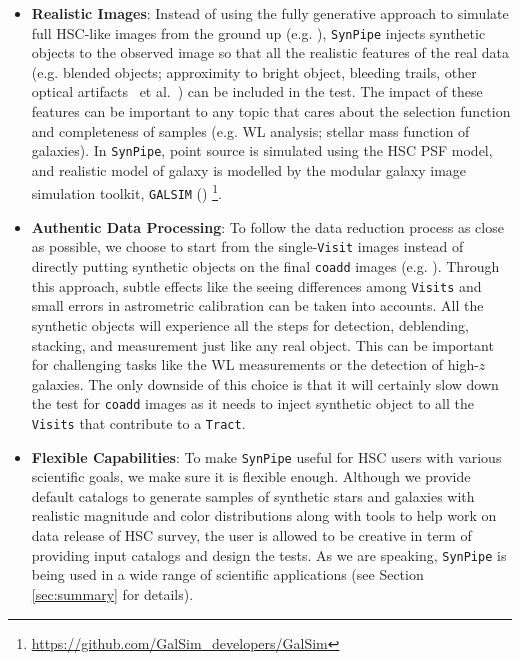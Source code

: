 \documentclass[useamsfonts]{pasj01}
\def\etal{{\ et al.~}}
\def\synpipe{\texttt{SynPipe}}
\def\tract{\texttt{Tract}}
\def\visit{\texttt{Visit}}
\def\visits{\texttt{Visits}}
\def\galsim{\texttt{G}{\scriptsize \texttt{AL}}\texttt{S}{\scriptsize \texttt{IM}}}
\begin{document}
    \begin{itemize}
    
        \item \textbf{Realistic Images}: 
            Instead of using the fully generative approach to simulate full HSC-like 
            images from the ground up (e.g. \citealt{Chang2015}), \synpipe{} injects
            synthetic objects to the observed image so that all the realistic 
            features of the real data (e.g. blended objects; approximity to bright 
            object, bleeding trails, other optical artifacts \etal) can be included 
            in the test. 
            The impact of these features can be important to any topic that cares 
            about the selection function and completeness of samples 
            (e.g. WL analysis; stellar mass function of galaxies). 
            In \synpipe{}, point source is simulated using the HSC PSF model, 
            and realistic model of galaxy is modelled by the modular galaxy image 
            simulation toolkit, \galsim{} (\citealt{Rowe2015})
            \footnote{\url{https://github.com/GalSim_developers/GalSim}}.

        \item \textbf{Authentic Data Processing}:
            To follow the data reduction process as close as possible, we choose to 
            start from the single-\visit{} images instead of directly putting
            synthetic objects on the final \texttt{coadd} images 
            (e.g. \citealt{Suchyta2016}).
            Through this approach, subtle effects like the seeing differences among 
            \visits{} and small errors in astrometric calibration can be taken 
            into accounts. 
            All the synthetic objects will experience all the steps for detection, 
            deblending, stacking, and measurement just like any real object. 
            This can be important for challenging tasks like the WL measurements
            or the detection of high-$z$ galaxies. 
            The only downside of this choice is that it will certainly slow down the 
            test for \texttt{coadd} images as it needs to inject synthetic object 
            to all the \visits{} that contribute to a \tract{}.
           
        \item \textbf{Flexible Capabilities}:
            To make \synpipe{} useful for HSC users with various scientific goals, 
            we make sure it is flexible enough. 
            Although we provide default catalogs to generate samples of synthetic stars 
            and galaxies with realistic magnitude and color distributions along with 
            tools to help work on data release of HSC survey, the user is allowed to 
            be creative in term of providing input catalogs and design the tests. 
            As we are speaking, \synpipe{} is being used in a wide range of 
            scientific applications (see Section \ref{sec:summary} for details). 
    
    \end{itemize}
    
\end{document}
